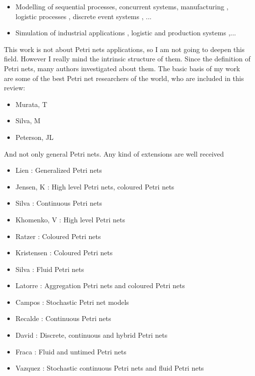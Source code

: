 \begin{itemize}
\item Modelling of sequential processes\cite{SM-Recalde1998267}, concurrent
systems\cite{EPN-SM-Jensen2007213,EPN-SM-Kristensen200819}, manufacturing \cite{G-Silva1989374,SM-Desrochers2010,SM-Silva19931,SM-Silva1997182,G-Silva201213}, logistic
processes \cite{SM-Guasch2002}, discrete event systems \cite{EPN-Balbo1998}, ...
\item Simulation of industrial applications \cite{SM-Jimenez2006159,SM-Latorre2013346}, logistic and production systems \cite{SM-Jimenez2004143},...
\end{itemize} 

This work is not about Petri nets applications, so I am not
going to deepen this field. 
However I really mind the intrinsic structure of them. Since the definition
of Petri nets,
many authors investigated about them. The basic basis of my work are some of the best Petri net researchers of the world, who are included in this review:
\begin{itemize}
\item Murata, T \cite{G-Murata1977412,G-SM-Murata19772,G-Murata1989541}
\item Silva, M \cite{G-Silva1985,G-Silva1993,G-Silva201213}
\item Peterson, JL \cite{G-EPN-Peterson1981}
\end{itemize} 



And not only general Petri nets. Any kind of extensions are well received
\begin{itemize}
\item Lien \cite{EPN-Lien1976251}: Generalized Petri nets
\item Jensen, K \cite{G-EPN-Jensen1985723,EPN-SM-Jensen2007213,EPN-Jensen2009}: High level
Petri nets, coloured Petri nets
\item Silva \cite{EPN-PROP-Silva2002314,EPN-SM-Silva2011427}: Continuous Petri nets 
\item Khomenko, V \cite{G-SM-Khomenko2003458}: High level Petri nets
\item Ratzer \cite{EPN-PROP-Ratzer2003450}: Coloured Petri nets
\item Kristensen \cite{EPN-Kristensen2004626,EPN-SM-Kristensen200819}: Coloured Petri nets
\item Silva \cite{EPN-Silva2004253}: Fluid Petri nets
\item Latorre \cite{EPN-SM-Latorre2010152,EPN-SM-Latorre2010247}: Aggregation Petri nets and coloured Petri nets
\item Campos \cite{EPN-Campos1992352}: Stochastic Petri net models
\item Recalde \cite{EPN-Recalde2010235}: Continuous Petri nets
\item David \cite{EPN-David2010}: Discrete, continuous and hybrid Petri nets
\item Fraca \cite{EPN-Fraca201221}: Fluid and untimed Petri nets
\item Vazquez \cite{EPN-Vazquez2012641,EPN-Vazquez2013365}: Stochastic continuous
Petri nets and fluid Petri nets
\end{itemize}

